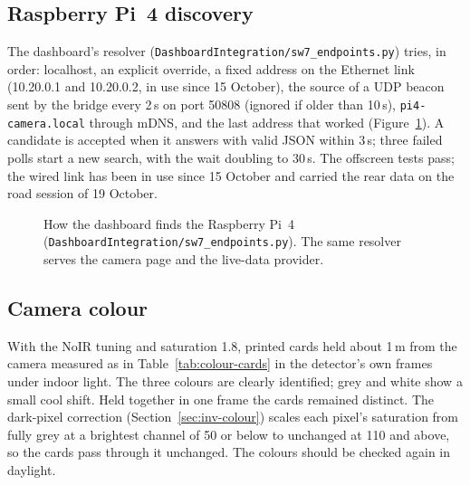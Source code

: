 \subsection*{Raspberry Pi~4 discovery}

The dashboard's resolver (\texttt{DashboardIntegration/\allowbreak{}sw7\_\allowbreak{}endpoints.py}) tries, in order: localhost, an explicit override, a fixed address on the Ethernet link (10.20.0.1 and 10.20.0.2, in use since 15 October), the source of a UDP beacon sent by the bridge every 2\,s on port 50808 (ignored if older than 10\,s), \texttt{pi4-camera.local} through mDNS, and the last address that worked (Figure~\ref{fig:pi4-discovery}). A candidate is accepted when it answers with valid JSON within 3\,s; three failed polls start a new search, with the wait doubling to 30\,s. The offscreen tests pass; the wired link has been in use since 15 October and carried the rear data on the road session of 19 October.

\begin{figure}[htbp]
\centering

\caption[How the dashboard finds the Raspberry Pi~4 (\texttt{DashboardIntegration/\allowbreak{}sw7\_\allowbreak{}endpoints.py})]{How the dashboard finds the Raspberry Pi~4 (\texttt{DashboardIntegration/\allowbreak{}sw7\_\allowbreak{}endpoints.py}). The same resolver serves the camera page and the live-data provider.}
\label{fig:pi4-discovery}
\end{figure}

\subsection*{Camera colour}

With the NoIR tuning and saturation 1.8, printed cards held about 1\,m from the camera measured as in Table~\ref{tab:colour-cards} in the detector's own frames under indoor light. The three colours are clearly identified; grey and white show a small cool shift. Held together in one frame the cards remained distinct. The dark-pixel correction (Section~\ref{sec:inv-colour}) scales each pixel's saturation from fully grey at a brightest channel of 50 or below to unchanged at 110 and above, so the cards pass through it unchanged. The colours should be checked again in daylight.

